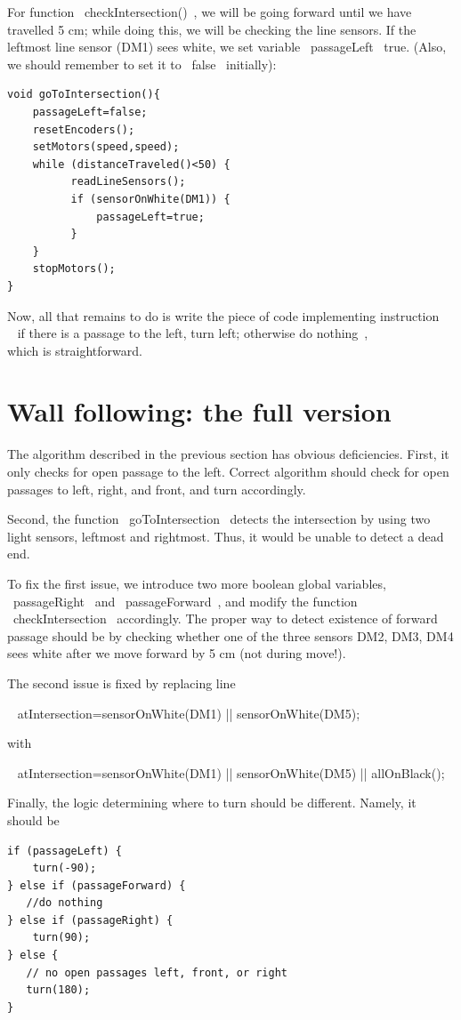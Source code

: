 \documentclass[oneside]{stml-l}
\numberwithin{figure}{chapter}
\begin{document}
For function ~checkIntersection()~, we will be going forward until
we have travelled 5 cm;  while doing this, we will be checking the
line sensors. If the leftmost line sensor (DM1)  sees white, we set
variable ~passageLeft~ true. (Also, we should remember to set it
to ~false~ initially):
\begin{lstlisting}
void goToIntersection(){
    passageLeft=false;
    resetEncoders();
    setMotors(speed,speed);
    while (distanceTraveled()<50) {
          readLineSensors();
          if (sensorOnWhite(DM1)) {
              passageLeft=true;
          }
    }
    stopMotors();
}
\end{lstlisting}

Now, all that remains to do is write the piece of code implementing
instruction \\
~ if there is a passage to the left, turn left; otherwise do nothing~, \\
which is straightforward.

\section{Wall following: the full version}
The algorithm described in the previous section has obvious deficiencies.
First, it only checks  for open passage to the left. Correct algorithm
should check for open passages to left, right,
and front, and turn accordingly.

Second, the function ~goToIntersection~ detects the intersection by
using two light sensors,  leftmost and rightmost. Thus, it would be
unable to detect a dead end.

To fix the first issue, we introduce two more boolean global variables,
~passageRight~ and  ~passageForward~, and modify the function ~checkIntersection~
accordingly. The proper  way to detect existence of forward passage should
be by checking whether one of the three sensors DM2, DM3, DM4 sees white
after we move forward by 5 cm (not during move!).

The second issue is fixed by replacing line

~ atIntersection=sensorOnWhite(DM1) || sensorOnWhite(DM5); ~

with

~ atIntersection=sensorOnWhite(DM1) || sensorOnWhite(DM5) || allOnBlack(); ~

Finally, the logic determining where to turn should be different. Namely, it should be
\begin{lstlisting}
if (passageLeft) {
    turn(-90);
} else if (passageForward) {
   //do nothing
} else if (passageRight) {
    turn(90);
} else {
   // no open passages left, front, or right
   turn(180);
}
\end{lstlisting}
\end{document}
